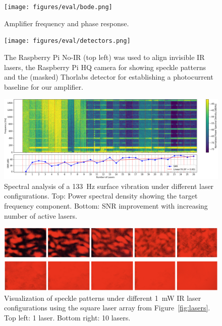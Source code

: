 \begin{figure}[t]
\centering
\texttt{[image: figures/eval/bode.png]}
\caption{Amplifier frequency and phase response.}
\label{fig:bodeplot}
\end{figure}



\begin{figure}[t]
\centering
\texttt{[image: figures/eval/detectors.png]}
\caption{The Raspberry Pi No-IR (top left) was used to align invisible IR lasers, the Raspberry Pi HQ camera for showing speckle patterns and the (masked) Thorlabs 
detector for establishing a photocurrent baseline for our amplifier.}
\label{fig:detectors}
\end{figure}

\begin{figure}[t]
    \centering
    \includegraphics[width=\textwidth]{figures/results/multilaser_spectrogram}
    \caption{Spectral analysis of a 133~Hz surface vibration under different laser configurations. 
    Top: Power spectral density showing the target frequency component. Bottom: SNR improvement with increasing number of active lasers.}
    \label{fig:laser_snr}
\end{figure}

\begin{figure}[t]
\centering
\includegraphics[width=\textwidth]{figures/eval/speckles}
\caption{Visualization of speckle patterns under different 1~mW IR laser configurations using the square laser array from Figure~\ref{fig:lasers}. Top left: 1 laser. Bottom right: 10 lasers.}
\label{fig:speckles}
\end{figure}
